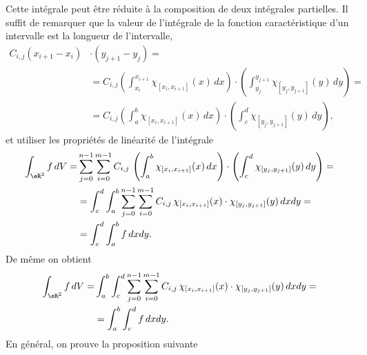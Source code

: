 Cette intégrale peut être réduite à la composition de deux intégrales partielles. Il suffit de remarquer que la valeur de l'intégrale de la fonction caractéristique d'un intervalle est la longueur de l'intervalle,
\begin{equation}
	\begin{aligned}
		C_{i,j}(x_{i+1}-x_i) & \cdot(y_{j+1}-y_j)=                                                                                                                               \\
		                     & =C_{i,j}\left(\int_{x_i}^{x_{i+1}}\chi_{[x_{i},x_{i+1}]}(x)\, dx \right)\cdot \left(\int_{y_j}^{y_{j+1}}\chi_{[y_{ j},y_{ j+1}]}(y)\, dy \right)= \\
		                     & =C_{i,j}\left(\int_{a}^{b}\chi_{[x_{i},x_{i+1}]}(x)\, dx \right)\cdot \left(\int_{c}^{d}\chi_{[y_{ j},y_{ j+1}]}(y)\, dy \right),
	\end{aligned}
\end{equation}
et utiliser les propriétés de linéarité de l'intégrale
\begin{equation}
	\begin{aligned}
		\int_{\eR^2}f \,dV = & \sum_{j=0}^{n-1}\sum_{i=0}^{m-1}C_{i,j}\,\left(\int_{a}^{b}\chi_{[x_{i},x_{i+1}]}(x)\, dx \right)\cdot \left(\int_{c}^{d}\chi_{[y_{ j},y_{ j+1}]}(y)\, dy \right)= \\
		                     & =\int_{c}^{d}\int_{a}^{b}\sum_{j=0}^{n-1}\sum_{i=0}^{m-1}C_{i,j}\,\chi_{[x_{i},x_{i+1}]}(x)\cdot \chi_{[y_{ j},y_{ j+1}]}(y)\, dx dy=                              \\
		                     & =\int_{c}^{d}\int_{a}^{b} f\, dx dy.
	\end{aligned}
\end{equation}
De même on obtient
\begin{equation}
	\begin{aligned}
		\int_{\eR^2}f \,dV = & \int_{a}^{b}\int_{c}^{d}\sum_{j=0}^{n-1}\sum_{i=0}^{m-1}C_{i,j}\,\chi_{[x_{i},x_{i+1}]}(x)\cdot \chi_{[y_{ j},y_{ j+1}]}(y)\, dx dy= \\
		                     & =\int_{a}^{b}\int_{c}^{d} f\, dx dy.
	\end{aligned}
\end{equation}
En général, on prouve la proposition suivante
